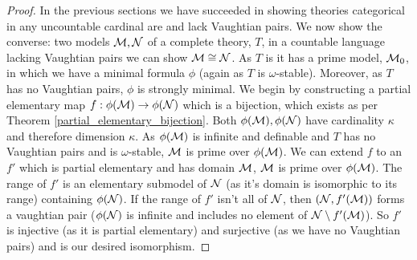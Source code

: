 \begin{proof}
In the previous sections we have succeeded in showing theories categorical in any uncountable cardinal are \omst and lack Vaughtian pairs. 
We now show the converse: two models \(\mathcal{M}, \mathcal{N}\)  of a complete \omst theory, \(T\), in a countable language lacking Vaughtian pairs we can show \(\mathcal{M} \cong \mathcal{N}\). 
As \(T\) is \omst it has a prime model, \(\mathcal{M}_0\), in which we have a minimal formula \(\phi\) (again as \(T\) is \(\omega\)-stable).
Moreover, as \(T\) has no Vaughtian pairs, \(\phi\) is strongly minimal. 
We begin by constructing a partial elementary map \(f:\phi(\mathcal{M}) \to \phi(\mathcal{N})\) which is a bijection, which exists as per Theorem \ref{partial_elementary_bijection}.
Both \(\phi(\mathcal{M}), \phi(\mathcal{N})\) have cardinality \(\kappa\) and therefore dimension \(\kappa\). 
As \(\phi(\mathcal{M})\) is infinite and definable and \(T\) has no Vaughtian pairs and is \(\omega\)-stable, \(\mathcal{M}\) is prime over \(\phi(\mathcal{M})\).
We can extend \(f\) to an \(f'\) which is partial elementary and has domain \(\mathcal{M}\), \(\mathcal{M}\) is prime over \(\phi(\mathcal{M})\).
The range of \(f'\) is an elementary submodel of \(\mathcal{N}\) (as it's domain is isomorphic to its range) containing \(\phi(\mathcal{N})\). 
If the range of \(f'\) isn't all of \(\mathcal{N}\), then \((\mathcal{N}, f'(\mathcal{M}))\) forms a vaughtian pair (\(\phi(\mathcal{N})\) is infinite and includes no element of \(\mathcal{N} \setminus f'(\mathcal{M})\)).  
So \(f'\) is injective (as it is partial elementary) and surjective (as we have no Vaughtian pairs) and is our desired isomorphism. 
\end{proof}
